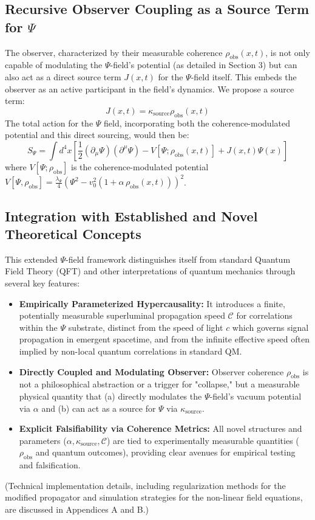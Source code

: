 \documentclass[11pt, a4paper]{book}
\begin{document}
\subsection{Recursive Observer Coupling as a Source Term for $\Psi$}
\label{ssec:mathframeworkext_recursivecoupling}
The observer, characterized by their measurable coherence $\rho_{\text{obs}}(x,t)$, is not only capable of modulating the $\Psi$-field's potential (as detailed in Section 3) but can also act as a direct source term $J(x,t)$ for the $\Psi$-field itself. This embeds the observer as an active participant in the field's dynamics. We propose a source term:
\[ J(x,t) = \kappa_{\text{source}} \rho_{\text{obs}}(x,t) \]
The total action for the $\Psi$ field, incorporating both the coherence-modulated potential and this direct sourcing, would then be:
\[ S_\Psi = \int d^4x \left[ \frac{1}{2} (\partial_\mu \Psi)(\partial^\mu \Psi) - V[\Psi; \rho_{\text{obs}}(x,t)] + J(x,t)\Psi(x) \right] \]
where $V[\Psi; \rho_{\text{obs}}]$ is the coherence-modulated potential $V[\Psi, \rho_{\text{obs}}] = \frac{\lambda_\Psi}{4} \left(\Psi^2 - v_0^2 (1 + \alpha\,\rho_{\text{obs}}(x,t))\right)^2$.

\subsection{Integration with Established and Novel Theoretical Concepts}
\label{ssec:mathframeworkext_integration}
This extended $\Psi$-field framework distinguishes itself from standard Quantum Field Theory (QFT) and other interpretations of quantum mechanics through several key features:
\begin{itemize}
    \item \textbf{Empirically Parameterized Hypercausality:} It introduces a finite, potentially measurable superluminal propagation speed $\mathcal{C}$ for correlations within the $\Psi$ substrate, distinct from the speed of light $c$ which governs signal propagation in emergent spacetime, and from the infinite effective speed often implied by non-local quantum correlations in standard QM.
    \item \textbf{Directly Coupled and Modulating Observer:} Observer coherence $\rho_{\text{obs}}$ is not a philosophical abstraction or a trigger for "collapse," but a measurable physical quantity that (a) directly modulates the $\Psi$-field's vacuum potential via $\alpha$ and (b) can act as a source for $\Psi$ via $\kappa_{\text{source}}$.
    \item \textbf{Explicit Falsifiability via Coherence Metrics:} All novel structures and parameters ($\alpha, \kappa_{\text{source}}, \mathcal{C}$) are tied to experimentally measurable quantities ($\rho_{\text{obs}}$ and quantum outcomes), providing clear avenues for empirical testing and falsification.
\end{itemize}
(Technical implementation details, including regularization methods for the modified propagator and simulation strategies for the non-linear field equations, are discussed in Appendices A and B.)
\end{document}
